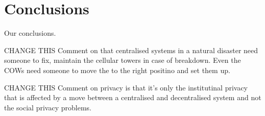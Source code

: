 \section{Conclusions}
Our conclusions.

CHANGE THIS Comment on that centralised systems in a natural disaster need someone to fix, maintain the cellular towers in case of breakdown. Even the COWs need someone to move the to the right positino and set them up.

CHANGE THIS Comment on privacy is that it's only the institutinal privacy that is affected by a move between a centralised and decentralised system and not the social privacy problems.
